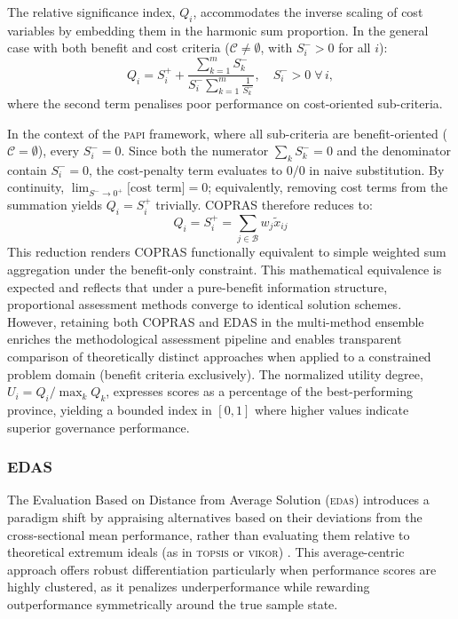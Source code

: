 \documentclass[12pt,a4paper]{article}
\newcommand{\PAPI}{\textsc{papi}\xspace}
\newcommand{\TOPSIS}{\textsc{topsis}\xspace}
\newcommand{\VIKOR}{\textsc{vikor}\xspace}
\newcommand{\EDAS}{\textsc{edas}\xspace}
\begin{document}
The relative significance index, \( Q_i \), accommodates the inverse scaling of cost variables by embedding them in the harmonic sum proportion. In the general case with both benefit and cost criteria ($\mathcal{C} \neq \emptyset$, with $S_i^- > 0$ for all $i$):
\begin{equation}
    Q_i = S_i^+ + \frac{\sum_{k=1}^{m} S_k^-}{S_i^- \sum_{k=1}^{m} \frac{1}{S_k^-}},
    \quad S_i^- > 0 \;\forall\, i,
\end{equation}
where the second term penalises poor performance on cost-oriented sub-criteria.

In the context of the \PAPI framework, where all sub-criteria are benefit-oriented ($\mathcal{C} = \emptyset$), every $S_i^- = 0$. Since both the numerator $\sum_k S_k^- = 0$ and the denominator contain $S_i^- = 0$, the cost-penalty term evaluates to $0/0$ in naive substitution. By continuity, $\lim_{S^- \to 0^+}\bigl[\text{cost term}\bigr] = 0$; equivalently, removing cost terms from the summation yields $Q_i = S_i^+$ trivially. COPRAS therefore reduces to:
\begin{equation}
    Q_i = S_i^+ = \sum_{j \in \mathcal{B}} w_j \tilde{x}_{ij}
\end{equation}
This reduction renders COPRAS functionally equivalent to simple weighted sum aggregation under the benefit-only constraint. This mathematical equivalence is expected and reflects that under a pure-benefit information structure, proportional assessment methods converge to identical solution schemes. However, retaining both COPRAS and EDAS in the multi-method ensemble enriches the methodological assessment pipeline and enables transparent comparison of theoretically distinct approaches when applied to a constrained problem domain (benefit criteria exclusively). The normalized utility degree, \( U_i = Q_i / \max_k Q_k \), expresses scores as a percentage of the best-performing province, yielding a bounded index in \([0, 1]\) where higher values indicate superior governance performance.

\subsubsection{EDAS}
\label{subsubsec:edas}
The Evaluation Based on Distance from Average Solution (\EDAS) introduces a paradigm shift by appraising alternatives based on their deviations from the cross-sectional mean performance, rather than evaluating them relative to theoretical extremum ideals (as in \TOPSIS or \VIKOR) \citep{Keshavarz2015}. This average-centric approach offers robust differentiation particularly when performance scores are highly clustered, as it penalizes underperformance while rewarding outperformance symmetrically around the true sample state.
\end{document}
